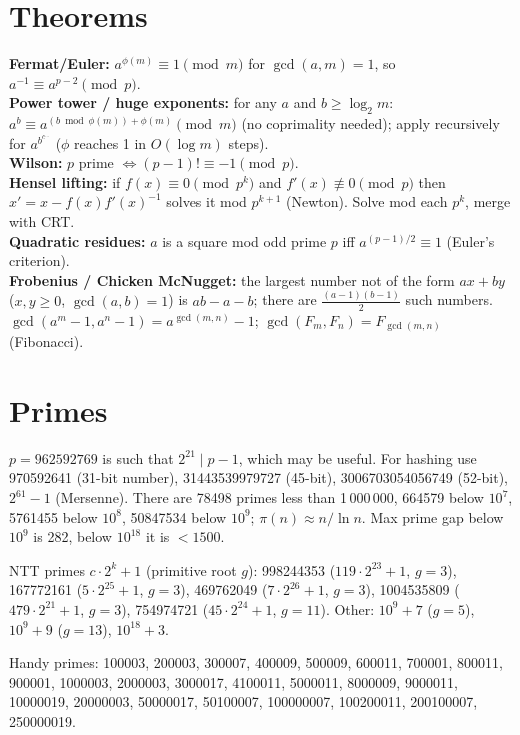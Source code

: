 \section{Theorems}
	\textbf{Fermat/Euler:} $a^{\phi(m)} \equiv 1 \pmod m$ for $\gcd(a,m)=1$, so $a^{-1} \equiv a^{p-2} \pmod p$.\\
	\textbf{Power tower / huge exponents:} for any $a$ and $b \ge \log_2 m$:
	$a^b \equiv a^{(b \bmod \phi(m)) + \phi(m)} \pmod m$ (no coprimality needed);
	apply recursively for $a^{b^{c^{\dots}}}$ ($\phi$ reaches 1 in $O(\log m)$ steps).\\
	\textbf{Wilson:} $p$ prime $\iff (p-1)! \equiv -1 \pmod p$.\\
	\textbf{Hensel lifting:} if $f(x) \equiv 0 \pmod {p^k}$ and $f'(x) \not\equiv 0 \pmod p$ then
	$x' = x - f(x) f'(x)^{-1}$ solves it mod $p^{k+1}$ (Newton). Solve mod each $p^k$, merge with CRT.\\
	\textbf{Quadratic residues:} $a$ is a square mod odd prime $p$ iff $a^{(p-1)/2} \equiv 1$ (Euler's criterion).\\
	\textbf{Frobenius / Chicken McNugget:} the largest number not of the form $ax+by$
	($x, y \ge 0$, $\gcd(a,b)=1$) is $ab-a-b$; there are $\frac{(a-1)(b-1)}{2}$ such numbers.\\
	$\gcd(a^m-1, a^n-1) = a^{\gcd(m,n)}-1$; $\gcd(F_m, F_n) = F_{\gcd(m,n)}$ (Fibonacci).

\section{Primes}
	$p=962592769$ is such that $2^{21} \mid p-1$, which may be useful. For hashing
	use 970592641 (31-bit number), 31443539979727 (45-bit), 3006703054056749
	(52-bit), $2^{61}-1$ (Mersenne). There are 78498 primes less than 1\,000\,000,
	664579 below $10^7$, 5761455 below $10^8$, 50847534 below $10^9$; $\pi(n) \approx n/\ln n$.
	Max prime gap below $10^9$ is 282, below $10^{18}$ it is $< 1500$.

	NTT primes $c \cdot 2^k + 1$ (primitive root $g$): 998244353 ($119\cdot 2^{23}{+}1$, $g{=}3$),
	167772161 ($5\cdot 2^{25}{+}1$, $g{=}3$), 469762049 ($7\cdot 2^{26}{+}1$, $g{=}3$),
	1004535809 ($479\cdot 2^{21}{+}1$, $g{=}3$), 754974721 ($45\cdot 2^{24}{+}1$, $g{=}11$).
	Other: $10^9{+}7$ ($g{=}5$), $10^9{+}9$ ($g{=}13$), $10^{18}{+}3$.

	Handy primes: 100003, 200003, 300007, 400009, 500009, 600011, 700001, 800011, 900001,
	1000003, 2000003, 3000017, 4100011, 5000011, 8000009, 9000011, 10000019, 20000003,
	50000017, 50100007, 100000007, 100200011, 200100007, 250000019.

